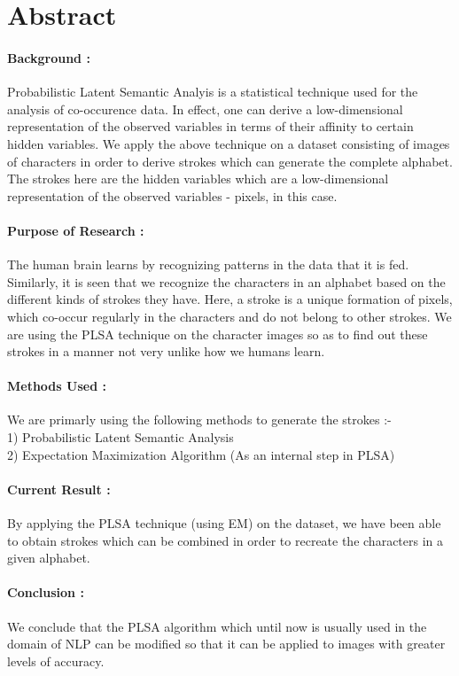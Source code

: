 \documentclass[10pt]{article}
\begin{document}
	\section{Abstract}
		\hrulefill
		\paragraph{Background :}
		Probabilistic Latent Semantic Analyis is a statistical technique used for the analysis of co-occurence data. In effect, one can derive a low-dimensional representation of the observed variables in terms of their affinity to certain hidden variables. We apply the above technique on a dataset consisting of images of characters in order to derive strokes which can generate the complete alphabet. The strokes here are the hidden variables which are a low-dimensional representation of the observed variables - pixels, in this case.
		\paragraph{Purpose of Research :}
		The human brain learns by recognizing patterns in the data that it is fed. Similarly, it is seen that we recognize the characters in an alphabet based on the different kinds of strokes they have. Here, a stroke is a unique formation of pixels, which co-occur regularly in the characters and do not belong to other strokes. We are using the PLSA technique on the character images so as to find out these strokes in a manner not very unlike how we humans learn.
		\paragraph{Methods Used :}
		We are primarly using the following methods to generate the strokes :- \\
		1) Probabilistic Latent Semantic Analysis\\2) Expectation Maximization Algorithm (As an internal step in PLSA)	
		\paragraph{Current Result :}
		By applying the PLSA technique (using EM) on the dataset, we have been able to obtain strokes which can be combined in order to recreate the characters in a given alphabet.
		\paragraph{Conclusion :}
		We conclude that the PLSA algorithm which until now is usually used in the domain of NLP can be modified so that it can be applied to images with greater levels of accuracy.
	\newpage
\end{document}
